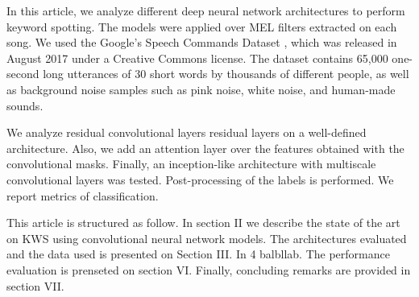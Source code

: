 In this article, we analyze different deep neural network architectures to perform keyword spotting. The models were applied over MEL filters extracted on each song. We used the Google’s Speech Commands Dataset \cite{warden2018speech},  which  was  released in  August  2017 under a Creative  Commons license. The  dataset contains  65,000 one-second long utterances of 30 short words by thousands of different people, as well as background noise samples such as pink noise, white noise, and human-made sounds.  

We analyze residual convolutional layers residual layers on a well-defined architecture. Also, we add an attention layer over the features obtained with the convolutional masks. Finally, an inception-like architecture with multiscale convolutional layers was tested. Post-processing of the labels is performed. We report metrics of classification.


This article is structured as follow. In section II we describe the state of the art on KWS using convolutional neural network models. The architectures evaluated and the data used is presented on Section III. In 4 balbllab. The performance evaluation is prenseted on section VI. Finally, concluding remarks are provided in section VII.

